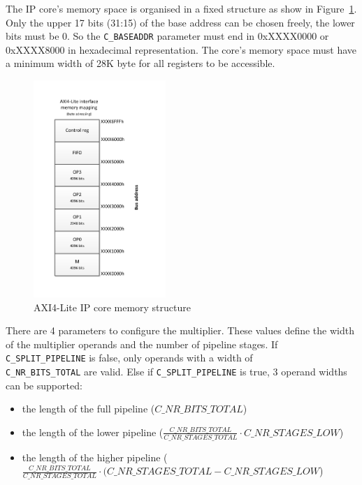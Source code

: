 \newpage
The IP core's memory space is organised in a fixed structure as show in Figure~\ref{AXImemstructure}. Only the upper 17
bits (31:15) of the base address can be chosen freely, the lower bits must be 0. So the \verb|C_BASEADDR| parameter must end
in 0xXXXX0000 or 0xXXXX8000 in hexadecimal representation. The core's memory space must have a minimum width of 28K byte for 
all registers to be accessible.
\begin{figure}[H]	
\centering
\includegraphics[trim=1.2cm 1.2cm 1.2cm 1.2cm, width=5cm]{pictures/axi_mem.pdf}
\caption{AXI4-Lite IP core memory structure}
\label{AXImemstructure}
\end{figure}

There are 4 parameters to configure the multiplier. These values define the width of the multiplier operands and the
number of pipeline stages. If \verb|C_SPLIT_PIPELINE| is false, only operands with a width of\\\verb|C_NR_BITS_TOTAL| are
valid. Else if \verb|C_SPLIT_PIPELINE| is true, 3 operand widths can be supported:
\begin{itemize}
  \item the length of the full pipeline ($C\_NR\_BITS\_TOTAL$)
  \item the length of the lower pipeline ($\frac{C\_NR\_BITS\_TOTAL}{C\_NR\_STAGES\_TOTAL} \cdot C\_NR\_STAGES\_LOW $)
  \item the length of the higher pipeline ($\frac{C\_NR\_BITS\_TOTAL}{C\_NR\_STAGES\_TOTAL} \cdot (C\_NR\_STAGES\_TOTAL - C\_NR\_STAGES\_LOW$)
\end{itemize}


